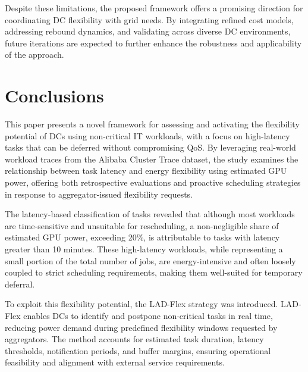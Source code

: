 \documentclass[preprint,12pt]{elsarticle}
\begin{document}
Despite these limitations, the proposed framework offers a promising direction for coordinating DC flexibility with grid needs. By integrating refined cost models, addressing rebound dynamics, and validating across diverse DC environments, future iterations are expected to further enhance the robustness and applicability of the approach.

%

%
%

%
%
%
%
%
%


%
%
%


\section{Conclusions}\label{conclusion}

This paper presents a novel framework for assessing and activating the flexibility potential of DCs using non-critical IT workloads, with a focus on high-latency tasks that can be deferred without compromising QoS. By leveraging real-world workload traces from the Alibaba Cluster Trace dataset, the study examines the relationship between task latency and energy flexibility using estimated GPU power, offering both retrospective evaluations and proactive scheduling strategies in response to aggregator-issued flexibility requests.

The latency-based classification of tasks revealed that although most workloads are time-sensitive and unsuitable for rescheduling, a non-negligible share of estimated GPU power, exceeding 20\%, is attributable to tasks with latency greater than 10 minutes. These high-latency workloads, while representing a small portion of the total number of jobs, are energy-intensive and often loosely coupled to strict scheduling requirements, making them well-suited for temporary deferral.

To exploit this flexibility potential, the LAD-Flex strategy was introduced. LAD-Flex enables DCs to identify and postpone non-critical tasks in real time, reducing power demand during predefined flexibility windows requested by aggregators. The method accounts for estimated task duration, latency thresholds, notification periods, and buffer margins, ensuring operational feasibility and alignment with external service requirements.
\end{document}

